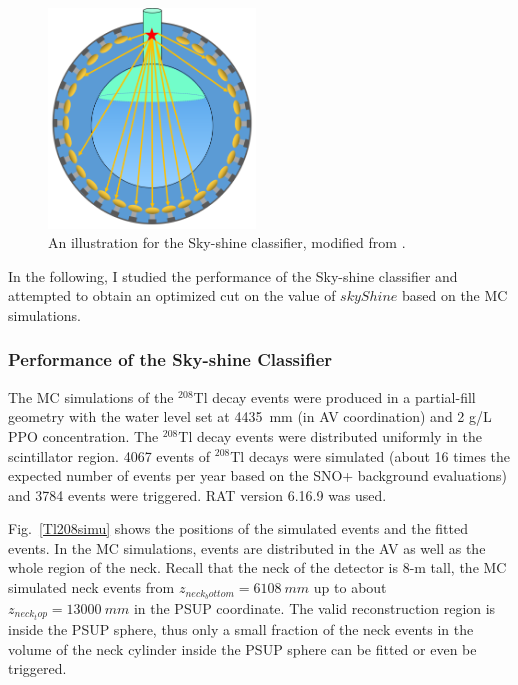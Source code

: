 \begin{figure}[!htb]
	\centering
	\includegraphics[width=5.5cm]{skyShine.png}
	\caption{ An illustration for the Sky-shine classifier, modified from \cite{skyshine}.}
	\label{skyshine}
\end{figure}

In the following, I studied the performance of the Sky-shine classifier and attempted to obtain an optimized cut on the value of $skyShine$ based on the MC simulations.

\subsubsection{Performance of the Sky-shine Classifier}
The MC simulations of the $^{208}$Tl decay events were produced in a partial-fill geometry with the water level set at 4435~mm (in AV coordination) and 2 g/L PPO concentration. The $^{208}$Tl decay events were distributed uniformly in the scintillator region. 4067 events of $^{208}$Tl decays were simulated (about 16 times the expected number of events per year based on the SNO+ background evaluations\cite{markchen_bkg}) and 3784 events were triggered. RAT version 6.16.9 was used. 

Fig.~\ref{Tl208simu} shows the positions of the simulated events and the fitted events. In the MC simulations, events are distributed in the AV as well as the whole region of the neck. Recall that the neck of the detector is 8-m tall, the MC simulated neck events from $z_{neck_bottom}=6108~mm$ up to about $z_{neck_top}=13000~mm$ in the PSUP coordinate. The valid reconstruction region is inside the PSUP sphere, thus only a small fraction of the neck events in the volume of the neck cylinder inside the PSUP sphere can be fitted or even be triggered.

